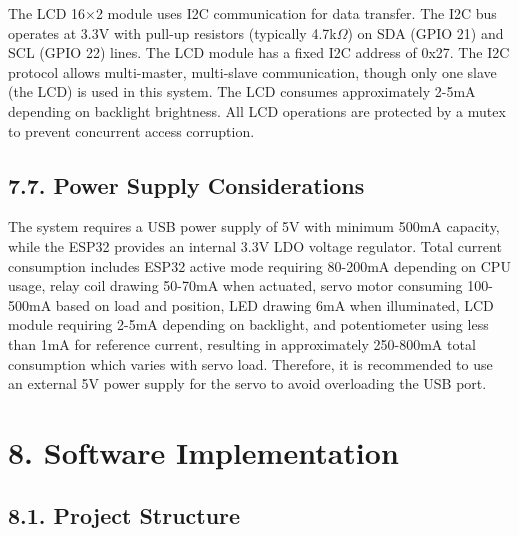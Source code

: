 \documentclass[12pt]{article}
\begin{document}
The LCD 16×2 module uses I2C communication for data transfer. The I2C bus operates at 3.3V with pull-up resistors (typically 4.7k$\Omega$) on SDA (GPIO 21) and SCL (GPIO 22) lines. The LCD module has a fixed I2C address of 0x27. The I2C protocol allows multi-master, multi-slave communication, though only one slave (the LCD) is used in this system. The LCD consumes approximately 2-5mA depending on backlight brightness. All LCD operations are protected by a mutex to prevent concurrent access corruption.

\subsection*{7.7. Power Supply Considerations}

The system requires a USB power supply of 5V with minimum 500mA capacity, while the ESP32 provides an internal 3.3V LDO voltage regulator. Total current consumption includes ESP32 active mode requiring 80-200mA depending on CPU usage, relay coil drawing 50-70mA when actuated, servo motor consuming 100-500mA based on load and position, LED drawing 6mA when illuminated, LCD module requiring 2-5mA depending on backlight, and potentiometer using less than 1mA for reference current, resulting in approximately 250-800mA total consumption which varies with servo load. Therefore, it is recommended to use an external 5V power supply for the servo to avoid overloading the USB port.

\section*{8. Software Implementation}

\subsection*{8.1. Project Structure}
\end{document}
